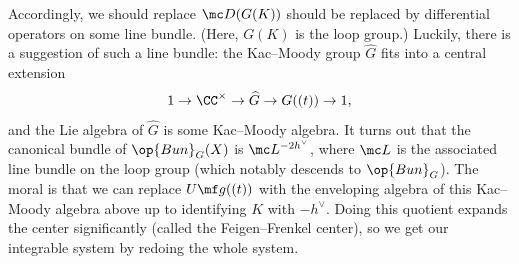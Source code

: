 \documentclass[../notes.tex]{subfiles}
\begin{document}
Accordingly, we should replace $\mc D(G(K))$ should be replaced by differential operators on some line bundle. (Here, $G(K)$ is the loop group.) Luckily, there is a suggestion of such a line bundle: the Kac--Moody group $\widehat G$ fits into a central extension
\[1\to\CC^\times\to\widehat G\to G((t))\to1,\]
and the Lie algebra of $\widehat G$ is some Kac--Moody algebra. It turns out that the canonical bundle of $\op{Bun}_G(X)$ is $\mc L^{-2h^\lor}$, where $\mc L$ is the associated line bundle on the loop group (which notably descends to $\op{Bun}_G$). The moral is that we can replace $U\mf g((t))$ with the enveloping algebra of this Kac--Moody algebra above up to identifying $K$ with $-h^\lor$. Doing this quotient expands the center significantly (called the Feigen--Frenkel center), so we get our integrable system by redoing the whole system.
\end{document}
